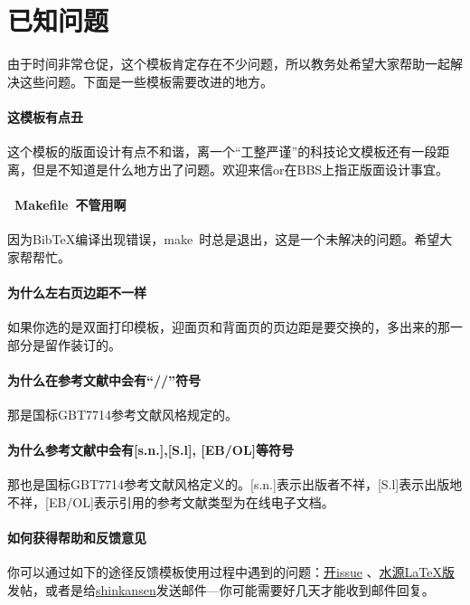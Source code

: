 

\chapter{已知问题}
\label{chap:needsomehelp}

由于时间非常仓促，这个模板肯定存在不少问题，所以教务处希望大家帮助一起解决这些问题。下面是一些模板需要改进的地方。

\subsubsection*{这模板有点丑}
这个模板的版面设计有点不和谐，离一个“工整严谨”的科技论文模板还有一段距离，但是不知道是什么地方出了问题。欢迎来信or在BBS上指正版面设计事宜。

\subsubsection*{~Makefile~不管用啊}
因为BibTeX编译出现错误，make~时总是退出，这是一个未解决的问题。希望大家帮帮忙。

\subsubsection*{为什么左右页边距不一样}
如果你选的是双面打印模板，迎面页和背面页的页边距是要交换的，多出来的那一部分是留作装订的。

\subsubsection*{为什么在参考文献中会有``//''符号}
那是国标GBT7714参考文献风格规定的。

\subsubsection*{为什么参考文献中会有[s.n.],[S.l], [EB/OL]等符号}
那也是国标GBT7714参考文献风格定义的。[s.n.]表示出版者不祥，[S.l]表示出版地不祥，[EB/OL]表示引用的参考文献类型为在线电子文档。

\subsubsection*{如何获得帮助和反馈意见}
你可以通过如下的途径反馈模板使用过程中遇到的问题：\href{https://github.com/weijianwen/sjtu-thesis-template-latex/issues}{开issue}
、\href{https://bbs.sjtu.edu.cn/bbsdoc?board=TeX_LaTeX}{水源LaTeX版}发帖，或者是给\href{mailto:weijianwen@gmail.com}{shinkansen}发送邮件---你可能需要好几天才能收到邮件回复。

